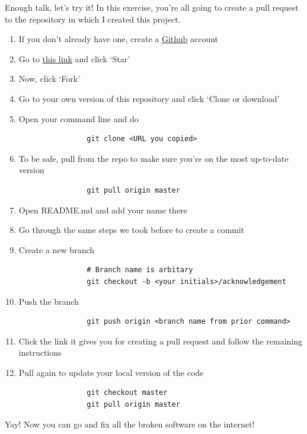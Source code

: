 \documentclass[pdf]{beamer} %
\begin{document}
\begin{frame}{Enough talk, let's try it!}
    In this exercise, you're all going to create a pull request to the repository in which I created this project.

    \bigskip
    \begin{enumerate}
        \item If you don't already have one, create a \href{https://www.github.com}{Github} account
        \item Go to \href{https://github.com/an1lam/git-gud}{this link} and click `Star'
        \item Now, click `Fork'
        \item Go to your own version of this repository and click `Clone or download'
        \item Open your command line and do
            \begin{verbatim}
                git clone <URL you copied>
            \end{verbatim}
        \item To be safe, pull from the repo to make sure you're on the most up-to-date version
            \begin{verbatim}
                git pull origin master
            \end{verbatim}
        \item Open README.md and add your name there
        \framebreak
        \item Go through the same steps we took before to create a commit
        \item Create a new branch
            \begin{verbatim}
                # Branch name is arbitary
                git checkout -b <your initials>/acknowledgement
            \end{verbatim}
        \item Push the branch
            \begin{verbatim}
                git push origin <branch name from prior command>
            \end{verbatim}
        \item Click the link it gives you for creating a pull request and follow the remaining instructions
        \item Pull again to update your local version of the code
            \begin{verbatim}
                git checkout master
                git pull origin master
            \end{verbatim}
    \end{enumerate}
    
    Yay! Now you can go and fix all the broken software on the internet!
\end{frame}
\end{document}
